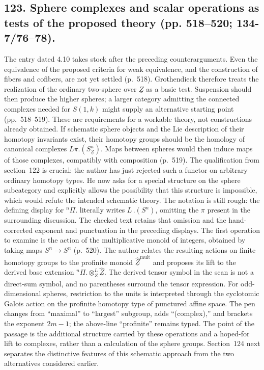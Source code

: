 \documentclass[10pt,oneside]{book}
\begin{document}
\subsection*{123. Sphere complexes and scalar operations as tests of the proposed theory (pp. 518--520; 134-7/76--78).}
The entry dated 4.10 takes stock after the preceding counterarguments. Even the equivalence of the proposed criteria for weak equivalence, and the construction of fibers and cofibers, are not yet settled (p.~518). Grothendieck therefore treats the realization of the ordinary two-sphere over $\underline Z$ as a basic test. Suspension should then produce the higher spheres; a larger category admitting the connected complexes needed for $S(1,k)$ might supply an alternative starting point (pp.~518--519). These are requirements for a workable theory, not constructions already obtained. If schematic sphere objects and the Lie description of their homotopy invariants exist, their homotopy groups should be the homology of canonical complexes $L\pi.(S^n_{\underline Z})$. Maps between spheres would then induce maps of those complexes, compatibly with composition (p.~519). The qualification from section~122 is crucial: the author has just rejected such a functor on arbitrary ordinary homotopy types. He now asks for a special structure on the sphere subcategory and explicitly allows the possibility that this structure is impossible, which would refute the intended schematic theory. The notation is still rough: the defining display for ${}^n\Pi.$ literally writes $L\,.(S^n)$, omitting the $\pi$ present in the surrounding discussion. The checked text retains that omission and the hand-corrected exponent and punctuation in the preceding displays. The first operation to examine is the action of the multiplicative monoid of integers, obtained by taking maps $S^n\to S^n$ (p.~520). The author relates the resulting actions on finite homotopy groups to the profinite monoid $\widehat{\underline Z}^{\mathrm{mult}}$ and proposes its lift to the derived base extension ${}^n\Pi.\otimes^{L}_{\underline Z}\widehat{\underline Z}$. The derived tensor symbol in the scan is not a direct-sum symbol, and no parentheses surround the tensor expression. For odd-dimensional spheres, restriction to the units is interpreted through the cyclotomic Galois action on the profinite homotopy type of punctured affine space. The pen changes from ``maximal'' to ``largest'' subgroup, adds ``(complex),'' and brackets the exponent $2m-1$; the above-line ``profinite'' remains typed. The point of the passage is the additional structure carried by these operations and a hoped-for lift to complexes, rather than a calculation of the sphere groups. Section~124 next separates the distinctive features of this schematic approach from the two alternatives considered earlier.
\end{document}
